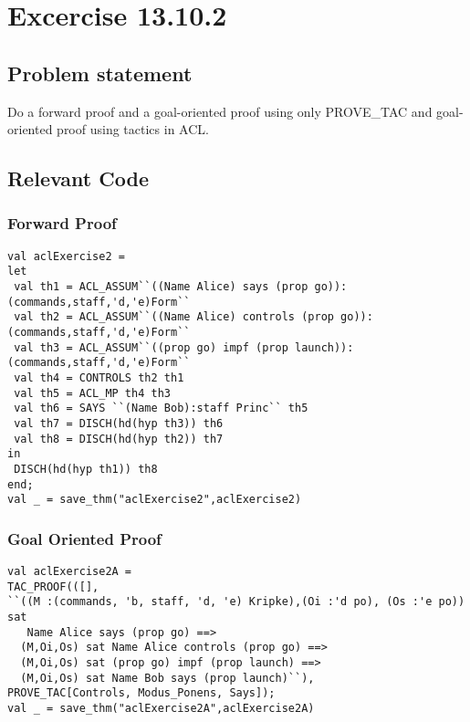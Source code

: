 \documentclass{report}
\begin{document}
\chapter{Excercise 13.10.2}
\label{cha:13.10.2}

\section{Problem statement}
\label{problem-statement-13-2}
Do a forward proof and a goal-oriented proof using only PROVE_TAC and goal-oriented proof using tactics in ACL.
\begin{quote}
\HOLsolutionsOneTheoremsaclExerciseTwo
\end{quote}

\section{Relevant Code}
\label{rel-code-13-2}

\subsection{Forward Proof}
\label{forward-proof-13-2}
\begin{lstlisting}[frame=TBlr]
val aclExercise2 =
let
 val th1 = ACL_ASSUM``((Name Alice) says (prop go)):(commands,staff,'d,'e)Form``
 val th2 = ACL_ASSUM``((Name Alice) controls (prop go)):(commands,staff,'d,'e)Form``
 val th3 = ACL_ASSUM``((prop go) impf (prop launch)):(commands,staff,'d,'e)Form``
 val th4 = CONTROLS th2 th1
 val th5 = ACL_MP th4 th3
 val th6 = SAYS ``(Name Bob):staff Princ`` th5
 val th7 = DISCH(hd(hyp th3)) th6
 val th8 = DISCH(hd(hyp th2)) th7
in
 DISCH(hd(hyp th1)) th8
end;
val _ = save_thm("aclExercise2",aclExercise2)
\end{lstlisting}

\subsection{Goal Oriented Proof}
\label{goal-oriented-proof-13-2}
\begin{lstlisting}[frame=TBlr]
val aclExercise2A =
TAC_PROOF(([],
``((M :(commands, 'b, staff, 'd, 'e) Kripke),(Oi :'d po), (Os :'e po)) sat
   Name Alice says (prop go) ==>
  (M,Oi,Os) sat Name Alice controls (prop go) ==>
  (M,Oi,Os) sat (prop go) impf (prop launch) ==>
  (M,Oi,Os) sat Name Bob says (prop launch)``),
PROVE_TAC[Controls, Modus_Ponens, Says]);
val _ = save_thm("aclExercise2A",aclExercise2A)
\end{lstlisting}
\end{document}
